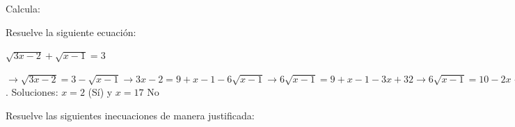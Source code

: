 \documentclass[addpoints,spanish, 12pt,a4paper]{exam}
\begin{document}
\begin{questions}

\question Calcula: 

\question Resuelve la siguiente ecuación: 

$\sqrt{3x-2}+\sqrt{x-1}=3$
\begin{solution}$\to\sqrt{3x-2}=3-\sqrt{x-1}\to 3x-2=9+x-1-6\sqrt{x-1}\to6\sqrt{x-1}=9+x-1-3x+32\to6\sqrt{x-1}=10-2x\to3\sqrt{x-1}=5-x\to x-1=25+x^2-10x\to x^2-19x+34=0$. Soluciones: $x=2$ (Sí) y $x=17$ No  \end{solution}



\question Resuelve las siguientes inecuaciones de manera justificada:
\end{questions}
\end{document}
